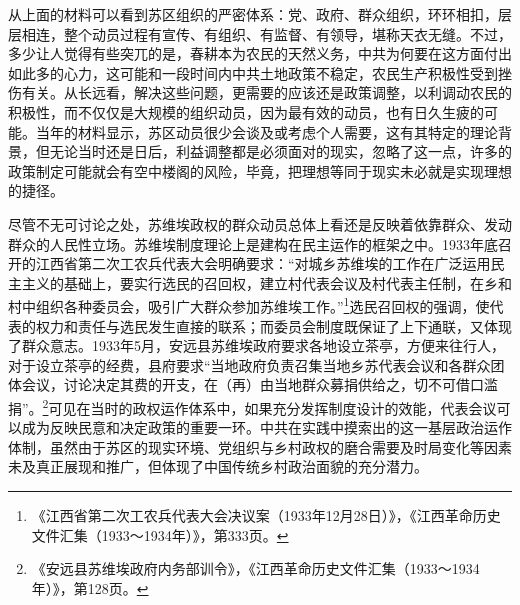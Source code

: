 从上面的材料可以看到苏区组织的严密体系：党、政府、群众组织，环环相扣，层层相连，整个动员过程有宣传、有组织、有监督、有领导，堪称天衣无缝。不过，多少让人觉得有些突兀的是，春耕本为农民的天然义务，中共为何要在这方面付出如此多的心力，这可能和一段时间内中共土地政策不稳定，农民生产积极性受到挫伤有关。从长远看，解决这些问题，更需要的应该还是政策调整，以利调动农民的积极性，而不仅仅是大规模的组织动员，因为最有效的动员，也有日久生疲的可能。当年的材料显示，苏区动员很少会谈及或考虑个人需要，这有其特定的理论背景，但无论当时还是日后，利益调整都是必须面对的现实，忽略了这一点，许多的政策制定可能就会有空中楼阁的风险，毕竟，把理想等同于现实未必就是实现理想的捷径。


尽管不无可讨论之处，苏维埃政权的群众动员总体上看还是反映着依靠群众、发动群众的人民性立场。苏维埃制度理论上是建构在民主运作的框架之中。1933年底召开的江西省第二次工农兵代表大会明确要求：“对城乡苏维埃的工作在广泛运用民主主义的基础上，要实行选民的召回权，建立村代表会议及村代表主任制，在乡和村中组织各种委员会，吸引广大群众参加苏维埃工作。”\footnote{《江西省第二次工农兵代表大会决议案（1933年12月28日）》，《江西革命历史文件汇集（1933～1934年）》，第333页。}选民召回权的强调，使代表的权力和责任与选民发生直接的联系；而委员会制度既保证了上下通联，又体现了群众意志。1933年5月，安远县苏维埃政府要求各地设立茶亭，方便来往行人，对于设立茶亭的经费，县府要求“当地政府负责召集当地乡苏代表会议和各群众团体会议，讨论决定其费的开支，在（再）由当地群众募捐供给之，切不可借口滥捐”。\footnote{《安远县苏维埃政府内务部训令》，《江西革命历史文件汇集（1933～1934年）》，第128页。}可见在当时的政权运作体系中，如果充分发挥制度设计的效能，代表会议可以成为反映民意和决定政策的重要一环。中共在实践中摸索出的这一基层政治运作体制，虽然由于苏区的现实环境、党组织与乡村政权的磨合需要及时局变化等因素未及真正展现和推广，但体现了中国传统乡村政治面貌的充分潜力。


